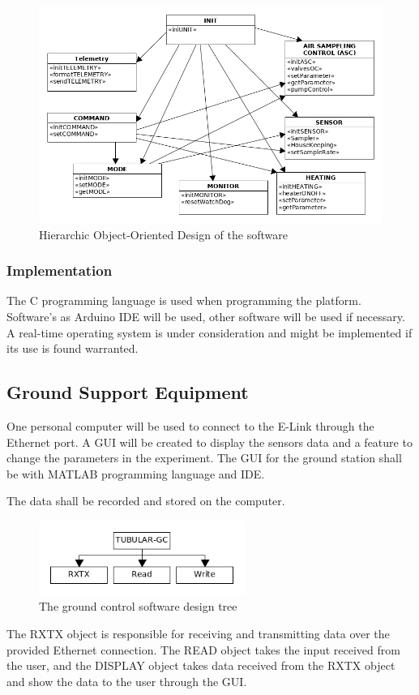 \documentclass[a4paper,12pt,twoside]{article}
\begin{document}
\begin{figure}[H]
    \centering
    \includegraphics[width=1\textwidth]{4-experiment-design/img/hood-diagram-v1-0.png}
    \caption{Hierarchic Object-Oriented Design of the software}
    \label{fig:hood}
\end{figure}
\subsubsection{Implementation}
The C programming language is used when programming the platform. Software's as Arduino IDE will be used, other software will be used if necessary. A real-time operating system is under consideration and might be implemented if its use is found warranted. 


\raggedbottom
\pagebreak
\subsection{Ground Support Equipment}
One personal computer will be used to connect to the E-Link through the Ethernet port. A GUI will be created to display the sensors data and a feature to change the parameters in the experiment. The GUI for the ground station shall be with MATLAB programming language and IDE.\par
The data shall be recorded and stored on the computer. 
\begin{figure}[H]
    \centering
    \includegraphics[width=0.6\textwidth]{4-experiment-design/img/gc-software-V1.png}
    \caption{The ground control software design tree}
    \label{fig:gcModel}
\end{figure}
The RXTX object is responsible for receiving and transmitting data over the provided Ethernet connection. The READ object takes the input received from the user, and the DISPLAY object takes data received from the RXTX object and show the data to the user through the GUI.
\end{document}
